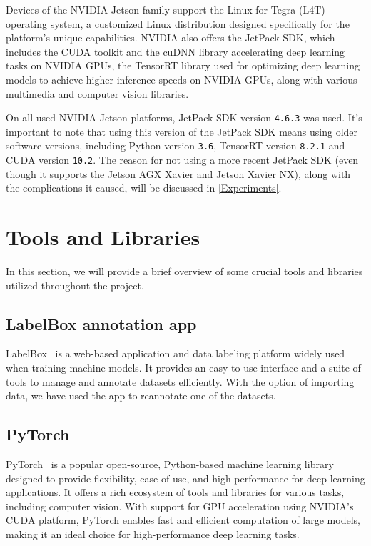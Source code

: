 Devices of the NVIDIA Jetson family support the Linux for Tegra (L4T) operating
system, a customized Linux distribution designed specifically for the platform's
unique capabilities. NVIDIA also offers the JetPack SDK, which includes the
CUDA toolkit and the cuDNN library accelerating deep learning tasks on NVIDIA
GPUs, the TensorRT library used for optimizing deep learning models to achieve
higher inference speeds on NVIDIA GPUs, along with various multimedia and
computer vision libraries.

On all used NVIDIA Jetson platforms, JetPack SDK version \texttt{4.6.3} was
used. It's important to note that using this version of the JetPack SDK means
using older software versions, including Python version \texttt{3.6}, TensorRT
version \texttt{8.2.1} and CUDA version \texttt{10.2}. The reason for not using
a more recent JetPack SDK (even though it supports the Jetson AGX Xavier and
Jetson Xavier NX), along with the complications it caused, will be discussed in
\autoref{Experiments}.


\section{Tools and Libraries}

In this section, we will provide a brief overview of some crucial tools and
libraries utilized throughout the project.


\subsection{LabelBox annotation app}

LabelBox~\cite{LabelBox} is a web-based application and data labeling platform
widely used when training machine models. It provides an easy-to-use interface
and a suite of tools to manage and annotate datasets efficiently. With the
option of importing data, we have used the app to reannotate one of the
datasets.


\subsection{PyTorch}

PyTorch~\cite{PyTorch} is a popular open-source, Python-based machine learning
library designed to provide flexibility, ease of use, and high performance for
deep learning applications. It offers a rich ecosystem of tools and libraries for
various tasks, including computer vision. With support for GPU acceleration
using NVIDIA's CUDA platform, PyTorch enables fast and efficient computation of
large models, making it an ideal choice for high-performance deep learning
tasks.

